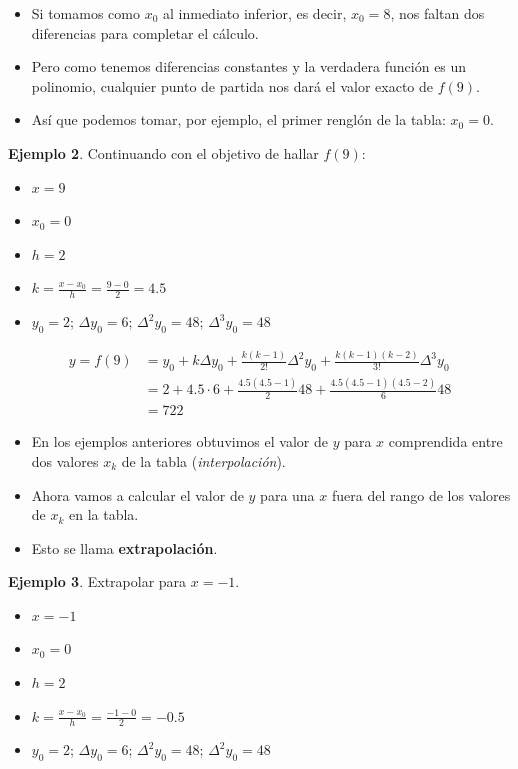 \documentclass[]{book}
\providecommand{\tightlist}{%
  \setlength{\itemsep}{0pt}\setlength{\parskip}{0pt}}
\begin{document}
\begin{itemize}
\tightlist
\item
  Si tomamos como \(x_0\) al inmediato inferior, es decir, \(x_0 = 8\), nos faltan dos diferencias para completar el cálculo.
\item
  Pero como tenemos diferencias constantes y la verdadera función es un polinomio, cualquier punto de partida nos dará el valor exacto de \(f(9)\).
\item
  Así que podemos tomar, por ejemplo, el primer renglón de la tabla: \(x_0=0\).
\end{itemize}

\textbf{Ejemplo 2}. Continuando con el objetivo de hallar \(f(9)\):

\begin{itemize}
\tightlist
\item
  \(x = 9\)
\item
  \(x_0 = 0\)
\item
  \(h = 2\)
\item
  \(k = \frac{x-x_0}{h} = \frac{9-0}{2} = 4.5\)
\item
  \(y_0 = 2\); \(\Delta y_0 = 6\); \(\Delta^2 y_0 = 48\); \(\Delta^3 y_0 = 48\)
\end{itemize}

\[
\begin{aligned}
y = f(9) &= y_0 + k \Delta y_0 + \frac{k(k-1)}{2!}\Delta^2 y_0 + \frac{k(k-1)(k-2)}{3!}\Delta^3 y_0\\
  & = 2 + 4.5 \cdot 6 + \frac{4.5 (4.5-1)}{2} 48 + \frac{4.5 (4.5-1)(4.5-2)}{6} 48 \\
  & = 722
\end{aligned}
\]

\begin{itemize}
\tightlist
\item
  En los ejemplos anteriores obtuvimos el valor de \(y\) para \(x\) comprendida entre dos valores \(x_k\) de la tabla (\emph{interpolación}).
\item
  Ahora vamos a calcular el valor de \(y\) para una \(x\) fuera del rango de los valores de \(x_k\) en la tabla.
\item
  Esto se llama \textbf{extrapolación}.
\end{itemize}

\textbf{Ejemplo 3}. Extrapolar para \(x = -1\).

\begin{itemize}
\tightlist
\item
  \(x = -1\)
\item
  \(x_0 = 0\)
\item
  \(h = 2\)
\item
  \(k = \frac{x-x_0}{h} = \frac{-1-0}{2} = -0.5\)
\item
  \(y_0 = 2\); \(\Delta y_0 = 6\); \(\Delta^2 y_0 = 48\); \(\Delta^2 y_0 = 48\)
\end{itemize}
\end{document}
